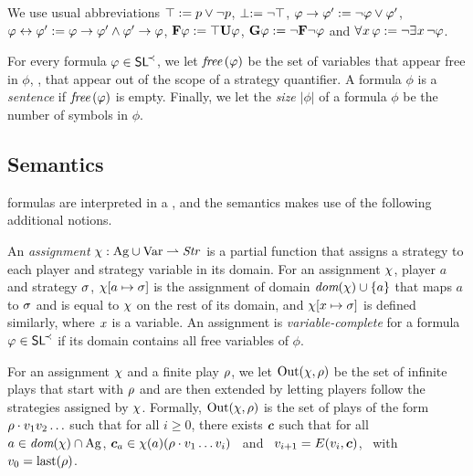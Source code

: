 We use usual abbreviations $\top:= p\vee\neg p$, $\perp:=\neg\top$, $\varphi\to\varphi':= \neg \varphi \vee \varphi'$,
$\varphi\leftrightarrow\varphi':= \varphi\to\varphi'\wedge \varphi'\to\varphi$,
 ${\bf F}\varphi := \top {\bf U} \varphi$,   ${\bf G}\varphi := \neg {\bf F}
\neg \varphi$ and
 $\forall^{} x\,\varphi:=\neg\exists^{} x\,\neg\varphi$. %

For every formula $\varphi\in\textnormal{{\sffamily SL}}^{\!\prec}$, we let  $\textit{free}\,(\varphi)$ be the set of variables that appear
free in $\phi$, \ie, that
appear out of the scope of a strategy quantifier. A formula $\phi$ is a \emph{sentence} if $\textit{free}\,(\varphi)$ is empty.
Finally, we let the \emph{size} $|\phi|$ of a formula $\phi$ be the
number of symbols in $\phi$.


\subsection{Semantics}
\label{sec-SLmodels}

 \SLref formulas are interpreted in a \CGS, and the semantics makes
 use of the following additional notions.

An \emph{assignment}  $\chi:\textnormal{Ag}\cup\textnormal{Var} \rightharpoonup \mbox{\emph{Str}}$
is a partial function that assigns a strategy  to
each  player and strategy variable in its domain.
For an assignment
$\chi$, player $a$ and  strategy $\sigma$,
$\chi[a\mapsto\sigma]$ is the assignment of domain
$\textit{dom}(\chi)\cup\{a\}$ that maps $a$ to $\sigma$ and is equal to
$\chi$ on the rest of its domain, and 
$\chi[x\mapsto \sigma]$ is defined similarly, where $x$ is a
variable. %
An assignment is
\emph{variable-complete} for a formula $\varphi\in\textnormal{{\sffamily SL}}^{\!\prec}$ if
its domain contains all free variables of $\phi$.

For an assignment $\chi$ and a finite play $\rho$, we let
$\textnormal{Out}(\chi,\rho)$ be the set of infinite plays that start with
$\rho$ and are then extended by letting players follow the strategies
assigned by $\chi$. Formally,
 $\textnormal{Out}(\chi,\rho)$ is the set of plays of the form $\rho \cdot
 v_{1}v_{2}\ldots$ such that for all $i\geq 0$, there exists
 $\bm{c}$ such that for all $a\in\textit{dom}(\chi)\cap\textnormal{Ag}$,
 $\bm{c}_a\in\chi(a)(\rho\cdot v_{1}\ldots v_i)$ \mbox{ and }
 $v_{i+1}=E(v_{i},\bm{c})$, \mbox{ with }
 $v_{0}=\mbox{last}(\rho)$.
 

